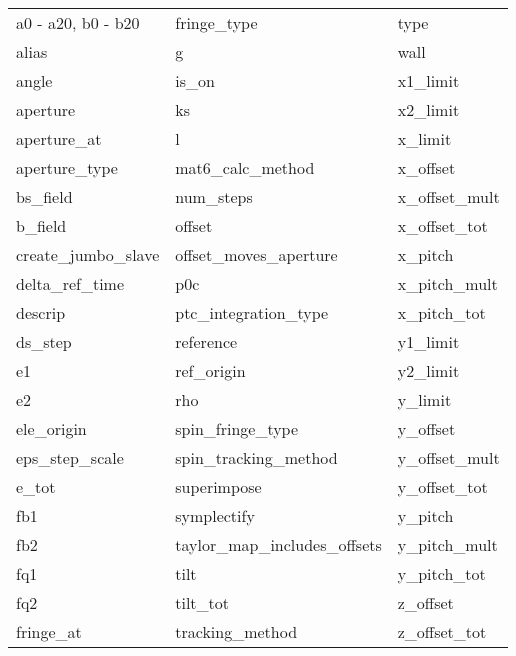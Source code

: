  \begin{tabular}{lll} \toprule
a0 - a20, b0 - b20          & fringe_type                 & type                        \\
alias                       & g                           & wall                        \\
angle                       & is_on                       & x1_limit                    \\
aperture                    & ks                          & x2_limit                    \\
aperture_at                 & l                           & x_limit                     \\
aperture_type               & mat6_calc_method            & x_offset                    \\
bs_field                    & num_steps                   & x_offset_mult               \\
b_field                     & offset                      & x_offset_tot                \\
create_jumbo_slave          & offset_moves_aperture       & x_pitch                     \\
delta_ref_time              & p0c                         & x_pitch_mult                \\
descrip                     & ptc_integration_type        & x_pitch_tot                 \\
ds_step                     & reference                   & y1_limit                    \\
e1                          & ref_origin                  & y2_limit                    \\
e2                          & rho                         & y_limit                     \\
ele_origin                  & spin_fringe_type            & y_offset                    \\
eps_step_scale              & spin_tracking_method        & y_offset_mult               \\
e_tot                       & superimpose                 & y_offset_tot                \\
fb1                         & symplectify                 & y_pitch                     \\
fb2                         & taylor_map_includes_offsets & y_pitch_mult                \\
fq1                         & tilt                        & y_pitch_tot                 \\
fq2                         & tilt_tot                    & z_offset                    \\
fringe_at                   & tracking_method             & z_offset_tot                \\
 \bottomrule
 \end{tabular}
 \vfill
 
